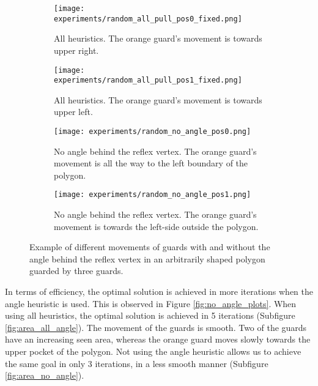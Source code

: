 \begin{figure}[h!]
    \centering
    \begin{subfigure}{0.45\textwidth}
        \texttt{[image: experiments/random\_all\_pull\_pos0\_fixed.png]}
        \caption{All heuristics. The orange guard's movement is towards upper right.}
        \label{fig:all_angle_pos0}
    \end{subfigure}
    \hfill
    \begin{subfigure}{0.45\textwidth}
        \texttt{[image: experiments/random\_all\_pull\_pos1\_fixed.png]}
        \caption{All heuristics. The orange guard's movement is towards upper left.}
        \label{fig:all_angle_pos1}
    \end{subfigure}
    \vfill
    \begin{subfigure}{0.45\textwidth}
        \texttt{[image: experiments/random\_no\_angle\_pos0.png]}
        \caption{No angle behind the reflex vertex. The orange guard's movement is all the way to the left boundary of the polygon.}
        \label{fig:no_angle_pos0}
    \end{subfigure}
    \hfill
    \begin{subfigure}{0.45\textwidth}
        \texttt{[image: experiments/random\_no\_angle\_pos1.png]}
        \caption{No angle behind the reflex vertex. The orange guard's movement is towards the left-side outside the polygon.}
        \label{fig:no_angle_pos1}
    \end{subfigure}
    \caption{Example of different movements of guards with and without the angle behind the reflex vertex in an arbitrarily shaped polygon guarded by three guards.}
    \label{fig:no_angle_eg}
\end{figure}

In terms of efficiency, the optimal solution is achieved in more iterations when the angle heuristic is used. This is observed in Figure \ref{fig:no_angle_plots}. When using all heuristics, the optimal solution is achieved in 5 iterations (Subfigure \ref{fig:area_all_angle}). The movement of the guards is smooth. Two of the guards have an increasing seen area, whereas the orange guard moves slowly towards the upper pocket of the polygon. Not using the angle heuristic allows us to achieve the same goal in only 3 iterations, in a less smooth manner (Subfigure \ref{fig:area_no_angle}).

